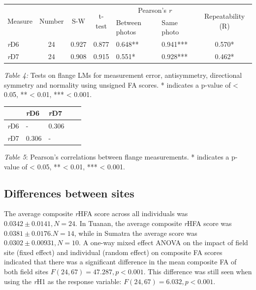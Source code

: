 \begin{center}
\begin{tabular}{l c c c l l c}
\hline
\multirow{2}{*}{Measure} & \multirow{2}{*}{Number} & \multirow{2}{*}{S-W} & \multirow{2}{*}{t-test} & \multicolumn{2}{c}{Pearson's \textit{r}} & \multirow{2}{*}{Repeatability (R)}\\ 
\cline{5-6}
& & & & Between photos & Same photo\\
\hline
\textit{r}D6 & 24 & 0.927 & 0.877 & 0.648** &  0.941*** & 0.570*\\

\textit{r}D7 & 24 & 0.908 & 0.915 & 0.551* &  0.928*** & 0.462*\\
\hline 
\end{tabular}
\end{center}
\textit{Table 4:} Tests on flange LMs for measurement error, antisymmetry, directional symmetry and normality using unsigned FA scores. * indicates a p-value of < 0.05, ** < 0.01, *** < 0.001.


\begin{center}
\begin{tabular}{l l l l l}
\hline
\multirow{1}{*}{  } & \multirow{1}{*}{\textit{r}D6} & \multirow{1}{*}{\textit{r}D7}\\ 
\hline
\textit{r}D6 & - & 0.306 \\

\textit{r}D7 & 0.306 & - \\
\hline 
\end{tabular}
\end{center}
\textit{Table 5}: Pearson's correlations between flange measurements. * indicates a p-value of < 0.05, ** < 0.01, *** < 0.001.

\subsection{Differences between sites}
The average composite \textit{r}HFA score across all individuals was \(0.0342 \pm 0.0141, N = 24\). In Tuanan, the average composite \textit{r}HFA score was \(0.0381 \pm 0.0176. N = 14\), while in Sumatra the average score was \(0.0302\pm0.00931, N = 10\). A one-way mixed effect ANOVA on the impact of field site (fixed effect) and individual (random effect) on composite FA scores indicated that there was a significant difference in the mean composite FA of both field sites \(F(24,67) = 47.287, p < 0.001\). This difference was still seen when using the \textit{r}H1 as the response variable: \(F(24,67) = 6.032, p < 0.001\).

